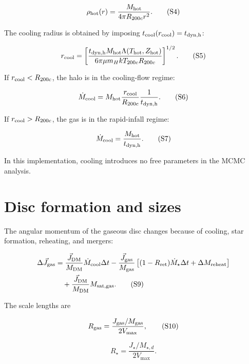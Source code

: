 \documentclass[11pt,a4paper]{article}
\begin{document}
\begin{equation}
 \rho_{\rm hot}(r)=\frac{M_{\rm hot}}{4\pi R_{200c}r^2}.
 \tag{S4}
\end{equation}

The cooling radius is obtained by imposing $t_{\rm cool}(r_{\rm cool})=t_{\rm dyn,h}$:

\begin{equation}
 r_{\rm cool}=\left[
 \frac{t_{\rm dyn,h}M_{\rm hot}\Lambda(T_{\rm hot},Z_{\rm hot})}
 {6\pi\mu m_H kT_{200c}R_{200c}}
 \right]^{1/2}.
 \tag{S5}
\end{equation}

If $r_{\rm cool}<R_{200c}$, the halo is in the cooling-flow regime:

\begin{equation}
 \dot M_{\rm cool}=M_{\rm hot}\frac{r_{\rm cool}}{R_{200c}}\frac{1}{t_{\rm dyn,h}}.
 \tag{S6}
\end{equation}

If $r_{\rm cool}>R_{200c}$, the gas is in the rapid-infall regime:

\begin{equation}
 \dot M_{\rm cool}=\frac{M_{\rm hot}}{t_{\rm dyn,h}}.
 \tag{S7}
\end{equation}

In this implementation, cooling introduces no free parameters in the MCMC analysis.

\section{Disc formation and sizes}
The angular momentum of the gaseous disc changes because of cooling, star formation, reheating, and mergers:

\begin{align}
 \Delta \vec J_{\rm gas} &=
 \frac{\vec J_{\rm DM}}{M_{\rm DM}}\dot M_{\rm cool}\Delta t
 -\frac{\vec J_{\rm gas}}{M_{\rm gas}}
 \left[(1-R_{\rm ret})\dot M_\star\Delta t+\Delta M_{\rm reheat}\right] \\
 &\quad +\frac{\vec J_{\rm DM}}{M_{\rm DM}}M_{\rm sat,gas}.
 \tag{S9}
\end{align}

The scale lengths are

\begin{equation}
 R_{\rm gas}=\frac{J_{\rm gas}/M_{\rm gas}}{2V_{\max}},
 \tag{S10}
\end{equation}

\begin{equation}
 R_\star=\frac{J_\star/M_{\star,d}}{2V_{\max}}.
 \tag{S11}
\end{equation}
\end{document}
